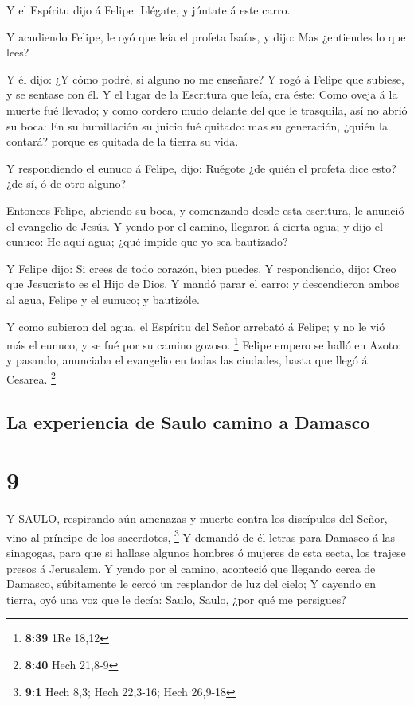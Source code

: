  Y el Espíritu dijo á Felipe: Llégate, y júntate á este
carro.

 Y acudiendo Felipe, le oyó que leía el profeta Isaías, y
dijo: Mas ¿entiendes lo que lees?

 Y él dijo: ¿Y cómo podré, si alguno no me enseñare? Y rogó
á Felipe que subiese, y se sentase con él.  Y el lugar de
la Escritura que leía, era éste: Como oveja á la muerte fué llevado; y
como cordero mudo delante del que le trasquila, así no abrió su boca:
 En su humillación su juicio fué quitado: mas su
generación, ¿quién la contará? porque es quitada de la tierra su vida.

 Y respondiendo el eunuco á Felipe, dijo: Ruégote ¿de quién
el profeta dice esto? ¿de sí, ó de otro alguno?

 Entonces Felipe, abriendo su boca, y comenzando desde esta
escritura, le anunció el evangelio de Jesús.  Y yendo por
el camino, llegaron á cierta agua; y dijo el eunuco: He aquí agua; ¿qué
impide que yo sea bautizado?

 Y Felipe dijo: Si crees de todo corazón, bien puedes. Y
respondiendo, dijo: Creo que Jesucristo es el Hijo de Dios.
 Y mandó parar el carro: y descendieron ambos al agua,
Felipe y el eunuco; y bautizóle.

 Y como subieron del agua, el Espíritu del Señor arrebató á
Felipe; y no le vió más el eunuco, y se fué por su camino gozoso.
\footnote{\textbf{8:39} 1Re 18,12}  Felipe empero se halló
en Azoto: y pasando, anunciaba el evangelio en todas las ciudades, hasta
que llegó á Cesarea. \footnote{\textbf{8:40} Hech 21,8-9}

\hypertarget{la-experiencia-de-saulo-camino-a-damasco}{%
\subsection{La experiencia de Saulo camino a
Damasco}\label{la-experiencia-de-saulo-camino-a-damasco}}

\hypertarget{section-8}{%
\section{9}\label{section-8}}

 Y SAULO, respirando aún amenazas y muerte contra los
discípulos del Señor, vino al príncipe de los sacerdotes, \footnote{\textbf{9:1}
  Hech 8,3; Hech 22,3-16; Hech 26,9-18}  Y demandó de él
letras para Damasco á las sinagogas, para que si hallase algunos hombres
ó mujeres de esta secta, los trajese presos á Jerusalem.  Y
yendo por el camino, aconteció que llegando cerca de Damasco,
súbitamente le cercó un resplandor de luz del cielo;  Y
cayendo en tierra, oyó una voz que le decía: Saulo, Saulo, ¿por qué me
persigues?

